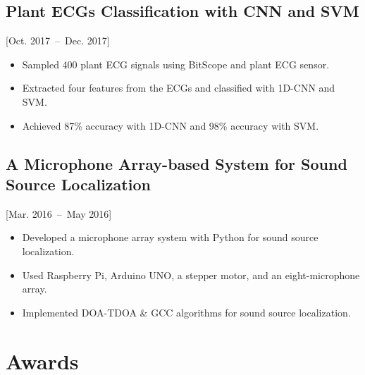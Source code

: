\documentclass{mycv}
\begin{document}
\vspace{-0.5em}

\subsection{Plant ECGs Classification with CNN and SVM}[Oct. 2017~--~Dec. 2017]

\begin{itemize}
  \item Sampled 400 plant ECG signals using BitScope and plant ECG sensor.
  \item Extracted four features from the ECGs and classified with 1D-CNN and SVM.
  \item Achieved 87\% accuracy with 1D-CNN and 98\% accuracy with SVM.
\end{itemize}

\vspace{-0.5em}

\subsection{A Microphone Array-based System for Sound Source Localization}[Mar. 2016~--~May 2016]

\begin{itemize}
  \itemsep 0em
  \item Developed a microphone array system with Python for sound source localization.
  \item Used Raspberry Pi, Arduino UNO, a stepper motor, and an eight-microphone array.
  \item Implemented DOA-TDOA \& GCC algorithms for sound source localization.
\end{itemize}



\vspace{-0.5em}

\section{Awards}
\end{document}
